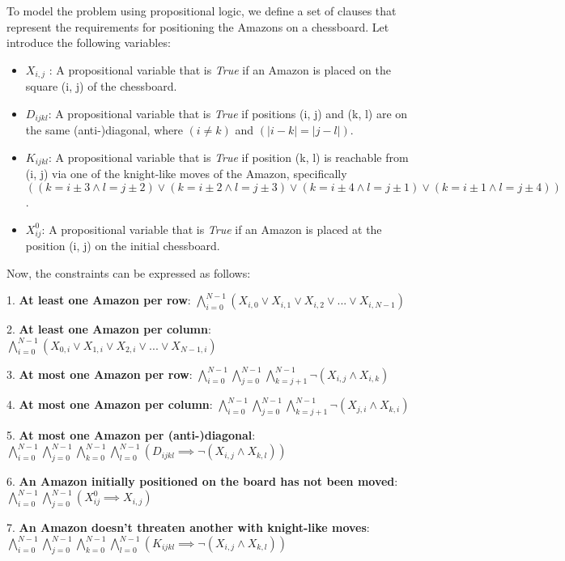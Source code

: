 \documentclass[11pt,a4paper]{report}
\begin{document}
\begin{answers}[10cm]
\small{
To model the problem using propositional logic, we define a set of clauses that represent the requirements for positioning the Amazons on a chessboard. Let introduce the following variables:
\begin{itemize}
    \item $X_{i,j}$ : A propositional variable that is \textit{True} if an Amazon is placed on the square (i, j) of the chessboard.
    \item $D_{ijkl}$: A propositional variable that is \textit{True} if positions (i, j) and (k, l) are on the same (anti-)diagonal, where $(i \neq k)$ and $(|i - k| = |j - l|)$.
    \item $K_{ijkl}$: A propositional variable that is \textit{True} if position (k, l) is reachable from (i, j) via one of the knight-like moves of the Amazon, specifically $((k = i \pm 3 \land l = j \pm 2) \lor (k = i \pm 2 \land l = j \pm 3) \lor (k = i \pm 4 \land l = j \pm 1) \lor (k = i \pm 1 \land l = j \pm 4))$.
    \item $X_{ij}^0$: A propositional variable that is \textit{True} if an Amazon is placed at the position (i, j) on the initial chessboard.
\end{itemize} 

Now, the constraints can be expressed as follows:

1. \textbf{At least one Amazon per row}: $\bigwedge_{i=0}^{N-1} (X_{i,0} \lor X_{i,1} \lor X_{i,2} \lor ... \lor X_{i,N-1})$

2. \textbf{At least one Amazon per column}: $\bigwedge_{i=0}^{N-1} (X_{0,i} \lor X_{1,i} \lor X_{2,i} \lor ... \lor X_{N-1,i})$

3. \textbf{At most one Amazon per row}: $\bigwedge_{i=0}^{N-1} \bigwedge_{j=0}^{N-1} \bigwedge_{k=j+1}^{N-1} \neg (X_{i,j} \land X_{i,k})$

4. \textbf{At most one Amazon per column}: $\bigwedge_{i=0}^{N-1} \bigwedge_{j=0}^{N-1} \bigwedge_{k=j+1}^{N-1} \neg (X_{j,i} \land X_{k,i})$
   
5. \textbf{At most one Amazon per (anti-)diagonal}: $\bigwedge_{i=0}^{N-1} \bigwedge_{j=0}^{N-1} \bigwedge_{k=0}^{N-1} \bigwedge_{l=0}^{N-1} (D_{ijkl} \implies \neg (X_{i,j} \land X_{k,l}))$
   
6. \textbf{An Amazon initially positioned on the board has not been moved}: $\bigwedge\limits_{i=0}^{N-1} \bigwedge\limits_{j=0}^{N-1} (X_{ij}^0 \implies X_{i,j})$

7. \textbf{An Amazon doesn't threaten another with knight-like moves}: \\ $\bigwedge_{i=0}^{N-1} \bigwedge_{j=0}^{N-1} \bigwedge_{k=0}^{N-1} \bigwedge_{l=0}^{N-1} (K_{ijkl} \implies \neg (X_{i,j} \land X_{k,l}))$
}
\end{answers}
\newpage
\end{document}
